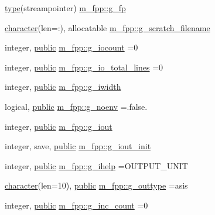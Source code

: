 \begin{DoxyCompactItemize}
\item 
\hyperlink{stop__watch_83_8txt_a70f0ead91c32e25323c03265aa302c1c}{type}(streampointer) \hyperlink{namespacem__fpp_a90e1828ada2e3a70200d2172c2ca9ef2}{m\+\_\+fpp\+::g\+\_\+fp}
\item 
\hyperlink{option__stopwatch_83_8txt_abd4b21fbbd175834027b5224bfe97e66}{character}(len=\+:), allocatable \hyperlink{namespacem__fpp_a228eed7955304567f03bab1a1b39c4ab}{m\+\_\+fpp\+::g\+\_\+scratch\+\_\+filename}
\item 
integer, \hyperlink{M__stopwatch_83_8txt_a2f74811300c361e53b430611a7d1769f}{public} \hyperlink{namespacem__fpp_a4d1d9ddcc7abec412be3a3e6c99b19e1}{m\+\_\+fpp\+::g\+\_\+iocount} =0
\item 
integer, \hyperlink{M__stopwatch_83_8txt_a2f74811300c361e53b430611a7d1769f}{public} \hyperlink{namespacem__fpp_ad1a67d3e00b9a0683ba0e10a42d0e588}{m\+\_\+fpp\+::g\+\_\+io\+\_\+total\+\_\+lines} =0
\item 
integer, \hyperlink{M__stopwatch_83_8txt_a2f74811300c361e53b430611a7d1769f}{public} \hyperlink{namespacem__fpp_a2dcc2372199e7d3cb6e318948cbd77c0}{m\+\_\+fpp\+::g\+\_\+iwidth}
\item 
logical, \hyperlink{M__stopwatch_83_8txt_a2f74811300c361e53b430611a7d1769f}{public} \hyperlink{namespacem__fpp_a495064207d70c0d79f3506fb735d4f07}{m\+\_\+fpp\+::g\+\_\+noenv} =.false.
\item 
integer, \hyperlink{M__stopwatch_83_8txt_a2f74811300c361e53b430611a7d1769f}{public} \hyperlink{namespacem__fpp_a741d58e0caef7e3b1aa6e56796d6d705}{m\+\_\+fpp\+::g\+\_\+iout}
\item 
integer, save, \hyperlink{M__stopwatch_83_8txt_a2f74811300c361e53b430611a7d1769f}{public} \hyperlink{namespacem__fpp_ac2149360808b5ac936e0cbfa075c0099}{m\+\_\+fpp\+::g\+\_\+iout\+\_\+init}
\item 
integer, \hyperlink{M__stopwatch_83_8txt_a2f74811300c361e53b430611a7d1769f}{public} \hyperlink{namespacem__fpp_ae0b89e9d5583b98efa43c34378112eca}{m\+\_\+fpp\+::g\+\_\+ihelp} =O\+U\+T\+P\+U\+T\+\_\+\+U\+N\+IT
\item 
\hyperlink{option__stopwatch_83_8txt_abd4b21fbbd175834027b5224bfe97e66}{character}(len=10), \hyperlink{M__stopwatch_83_8txt_a2f74811300c361e53b430611a7d1769f}{public} \hyperlink{namespacem__fpp_aced59ed7cc330b1975f7d89c808273eb}{m\+\_\+fpp\+::g\+\_\+outtype} =\textquotesingle{}asis\textquotesingle{}
\item 
integer, \hyperlink{M__stopwatch_83_8txt_a2f74811300c361e53b430611a7d1769f}{public} \hyperlink{namespacem__fpp_ac4ca8efb06bd0c3da1498d32f0425e3f}{m\+\_\+fpp\+::g\+\_\+inc\+\_\+count} =0

\end{DoxyCompactItemize}
